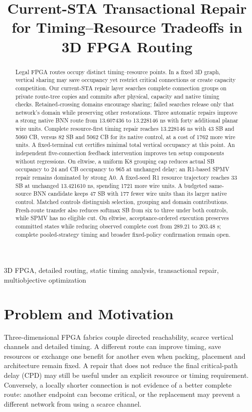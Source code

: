 \documentclass[conference,10pt]{IEEEtran}
\title{Current-STA Transactional Repair for Timing--Resource Tradeoffs in 3D FPGA Routing}
\author{\IEEEauthorblockN{Anonymous development manuscript}}
\begin{document}
\maketitle
\begin{abstract}
Legal FPGA routes occupy distinct timing--resource points. In a fixed 3D graph, vertical sharing may save occupancy yet restrict critical connections or create capacity competition. Our current-STA repair layer searches complete connection groups on private route-tree copies and commits after physical, capacity and native timing checks. Retained-crossing domains encourage sharing; failed searches release only that network's domain while preserving other restorations. Three automatic repairs improve a strong native BNN route from 13.607436 to 13.228146 ns with forty additional planar wire units. Complete resource-first timing repair reaches 13.228146 ns with 43 SB and 5060 CB, versus 82 SB and 5062 CB for its native control, at a cost of 1762 more wire units. A fixed-terminal cut certifies minimal total vertical occupancy at this point. An independent five-connection feedback intervention improves ten setup components without regressions. On eltwise, a uniform K8 grouping cap reduces actual SB occupancy to 24 and CB occupancy to 965 at unchanged delay; an R1-based SPMV repair remains dominated by strong A0. A fixed-seed R1 resource trajectory reaches 33 SB at unchanged 13.421610 ns, spending 1721 more wire units. A budgeted same-source BNN candidate keeps 47 SB with 177 fewer wire units than its larger native control. Matched controls distinguish selection, grouping and domain contributions. Fresh-route transfer also reduces softmax SB from six to three under both controls, while SPMV has no eligible cut. On eltwise, acceptance-ordered execution preserves committed states while reducing observed complete cost from 289.21 to 203.48 s; complete pooled-strategy timing and broader fixed-policy confirmation remain open.
\end{abstract}
\begin{IEEEkeywords}
3D FPGA, detailed routing, static timing analysis, transactional repair, multiobjective optimization
\end{IEEEkeywords}

\section{Problem and Motivation}
Three-dimensional FPGA fabrics couple directed reachability, scarce vertical channels and detailed timing. A different route can improve timing, save resources or exchange one benefit for another even when packing, placement and architecture remain fixed. A repair that does not reduce the final critical-path delay (CPD) may still be useful under an explicit resource or timing requirement. Conversely, a locally shorter connection is not evidence of a better complete route: another endpoint can become critical, or the replacement may prevent a different network from using a scarce channel.
\end{document}
